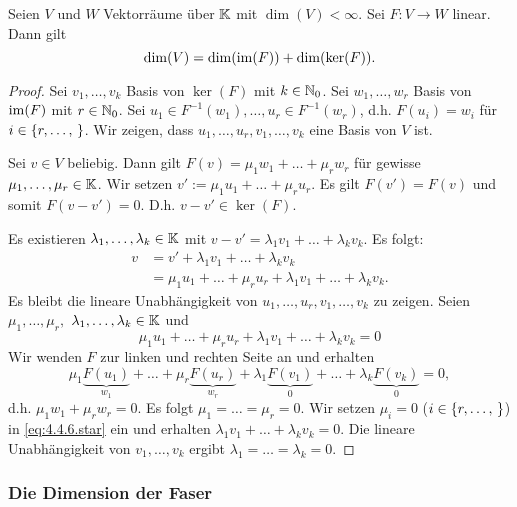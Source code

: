 \begin{thm}
	Seien $ V $ und $ W $ Vektorräume über $ \mathbb K $ mit $ \dim(V) < \infty $. Sei $ F : V \to W $ linear. Dann gilt
	\begin{equation}
		\dim(V) = \dim(\operatorname{im}(F)) + \dim(\ker(F)).
	\end{equation}
\end{thm}
\begin{proof}
	Sei $ v_1,\ldots,v_k $ Basis von $ \ker(F) $ mit $ k \in \mathbb N_0 $. Sei $ w_1,\ldots,w_r $ Basis von $ \operatorname{im}(F) $ mit $ r \in \mathbb N_0 $. Sei $ u_1 \in F^{-1}(w_1), \ldots, u_r \in F^{-1}(w_r) $, d.h. $ F(u_i) = w_i $ für $ i \in \is{r} $. Wir zeigen, dass $ u_1, \ldots, u_r, v_1, \ldots, v_k $ eine Basis von $ V $ ist.
	
	Sei $ v \in V $ beliebig. Dann gilt $ F(v) = \mu_1w_1 + \ldots + \mu_rw_r $ für gewisse $ \mu_1, \ldots, \mu_r \in \mathbb K $. Wir setzen $ v' := \mu_1u_1 + \ldots + \mu_ru_r $. Es gilt $ F(v') = F(v) $ und somit $ F(v-v') = 0 $. D.h. $ v-v' \in \ker(F) $.
	
	Es existieren $ \lambda_1, \ldots, \lambda_k \in \mathbb K $ mit $ v-v' = \lambda_1v_1 + \ldots + \lambda_kv_k $. Es folgt:
	\begin{align*}
		v &= v' + \lambda_1v_1 + \ldots + \lambda_kv_k\\
		&= \mu_1u_1 + \ldots + \mu_ru_r + \lambda_1v_1 + \ldots + \lambda_kv_k.
	\end{align*}
	Es bleibt die lineare Unabhängigkeit von $ u_1, \ldots, u_r, v_1, \ldots, v_k $ zu zeigen. Seien $ \mu_1, \ldots, \mu_r, $ $ \lambda_1, \ldots, \lambda_k \in \mathbb K $ und
	\begin{equation}
		\mu_1u_1 + \ldots + \mu_ru_r + \lambda_1v_1 + \ldots + \lambda_kv_k = 0
		\label{eq:4.4.6.star}
	\end{equation}
	Wir wenden $ F $ zur linken und rechten Seite an und erhalten
	\begin{equation*}
		\mu_1\underbrace{F(u_1)}_{w_1} + \ldots + \mu_r\underbrace{F(u_r)}_{w_r} + \lambda_1\underbrace{F(v_1)}_{0} + \ldots + \lambda_k\underbrace{F(v_k)}_{0} = 0,
	\end{equation*}
	d.h. $ \mu_1w_1 + \mu_rw_r = 0 $. Es folgt $ \mu_1 = \ldots = \mu_r = 0 $. Wir setzen $ \mu_i = 0 $ ($ i \in \is{r} $) in \eqref{eq:4.4.6.star} ein und erhalten $ \lambda_1v_1 + \ldots + \lambda_kv_k = 0 $. Die lineare Unabhängigkeit von $ v_1, \ldots, v_k $ ergibt $ \lambda_1 = \ldots = \lambda_k = 0 $.
\end{proof}

\subsubsection{Die Dimension der Faser}

